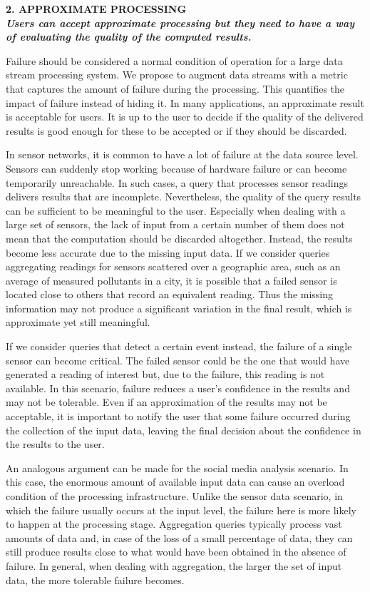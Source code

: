 \textbf{2. APPROXIMATE PROCESSING \\ \textit{Users can accept approximate processing but they need to have a
way of evaluating the quality of the computed results.}}

 	Failure should be considered a normal condition of operation for a large data stream processing
	system. We propose to augment data streams with a metric that captures the amount of failure during
	the processing. This quantifies the impact of failure instead of hiding it. 
	In many applications, an approximate result is acceptable for users. It is up to the user to decide if the quality
	of the delivered results is good enough for these to be accepted or if they should be discarded.

In sensor networks, it is common to have a lot of failure at the data source level. Sensors can suddenly
stop working because of hardware failure or can become temporarily unreachable. In such cases, a query
that processes sensor readings delivers results that are incomplete. Nevertheless, the quality of the
query results can be sufficient to be meaningful to the user. Especially when dealing with a large set of
sensors, the lack of input from a certain number of them does not mean that the computation should be
discarded altogether. Instead, the results become less accurate due to the missing input data. If we
consider queries aggregating readings for sensors scattered over a geographic area, such as an average of
measured pollutants in a city, it is possible that a failed sensor is located close to others that
record an equivalent reading. Thus the missing information may not produce a significant variation in the final
result, which is approximate yet still meaningful.

If we consider queries that detect a certain event instead, the failure of a single sensor can become
critical. The failed sensor could be the one that would have generated a reading of interest but, due to
the failure, this reading is not available. In this scenario, failure reduces a user's confidence in the
results and may not be tolerable. Even if an approximation of the results may not be acceptable, it is
important to notify the user that some failure occurred during the collection of the input data, leaving
the final decision about the confidence in the results to the user.

An analogous argument can be made for the social media analysis scenario. In this case, the enormous
amount of available input data can cause an overload condition of the processing infrastructure.
Unlike the sensor data scenario, in which the failure usually occurs at the input level, the failure here
is more likely to happen at the processing stage. Aggregation queries typically process vast amounts of
data and, in case of the loss of a small percentage of data, they can still produce results close to what
would have been obtained in the absence of failure. In general, when dealing with aggregation, the larger
the set of input data, the more tolerable failure becomes.\\

